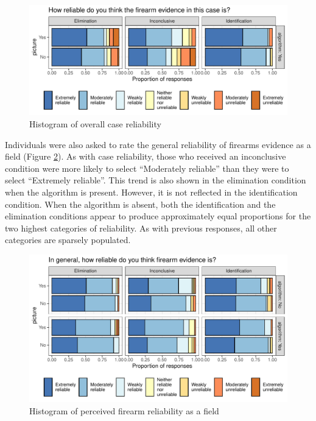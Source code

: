 \documentclass[print]{nuthesis}
\begin{document}
\begin{figure}

{\centering \includegraphics[width=\linewidth]{thesis_files/figure-latex/caserel-1} 

}

\caption{Histogram of overall case reliability}\label{fig:caserel}
\end{figure}

Individuals were also asked to rate the general reliability of firearms evidence as a field (Figure \ref{fig:genrel}).
As with case reliability, those who received an inconclusive condition were more likely to select ``Moderately reliable'' than they were to select ``Extremely reliable''.
This trend is also shown in the elimination condition when the algorithm is present.
However, it is not reflected in the identification condition.
When the algorithm is absent, both the identification and the elimination conditions appear to produce approximately equal proportions for the two highest categories of reliability.
As with previous responses, all other categories are sparsely populated.

\begin{figure}

{\centering \includegraphics[width=\linewidth]{thesis_files/figure-latex/genrel-1} 

}

\caption{Histogram of perceived firearm reliability as a field}\label{fig:genrel}
\end{figure}
\end{document}

